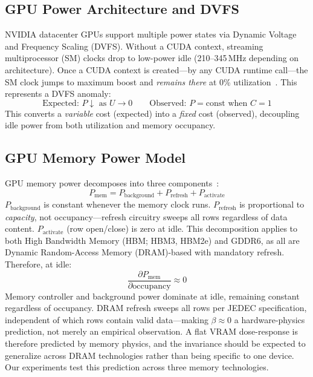 \documentclass[sigconf,nonacm]{acmart}
\begin{document}
\subsection{GPU Power Architecture and DVFS}

NVIDIA datacenter GPUs support multiple power states via Dynamic Voltage and Frequency Scaling (DVFS). Without a CUDA context, streaming multiprocessor (SM) clocks drop to low-power idle (210--345\,MHz depending on architecture). Once a CUDA context is created---by any CUDA runtime call---the SM clock jumps to maximum boost and \emph{remains there} at 0\% utilization~\cite{patel-cal23}. This represents a DVFS anomaly:
\begin{equation}
    \text{Expected: } P \downarrow \text{ as } U \to 0 \qquad \text{Observed: } P = \text{const when } C = 1
    \label{eq:dvfs-anomaly}
\end{equation}
This converts a \emph{variable} cost (expected) into a \emph{fixed} cost (observed), decoupling idle power from both utilization and memory occupancy.

\subsection{GPU Memory Power Model}

GPU memory power decomposes into three components~\cite{hbm-spec,micron-ddr}:
\begin{equation}
    P_{\text{mem}} = P_{\text{background}} + P_{\text{refresh}} + P_{\text{activate}}
    \label{eq:mem-power}
\end{equation}
$P_{\text{background}}$ is constant whenever the memory clock runs. $P_{\text{refresh}}$ is proportional to \emph{capacity}, not occupancy---refresh circuitry sweeps all rows regardless of data content. $P_{\text{activate}}$ (row open/close) is zero at idle. This decomposition applies to both High Bandwidth Memory (HBM; HBM3, HBM2e) and GDDR6, as all are Dynamic Random-Access Memory (DRAM)-based with mandatory refresh. Therefore, at idle:
\begin{equation}
    \frac{\partial P_{\text{mem}}}{\partial \text{occupancy}} \approx 0
    \label{eq:mem-prediction}
\end{equation}
Memory controller and background power dominate at idle, remaining constant regardless of occupancy. DRAM refresh sweeps all rows per JEDEC specification, independent of which rows contain valid data---making $\beta \approx 0$ a hardware-physics prediction, not merely an empirical observation. A flat VRAM dose-response is therefore predicted by memory physics, and the invariance should be expected to generalize across DRAM technologies rather than being specific to one device. Our experiments test this prediction across three memory technologies.
\end{document}

